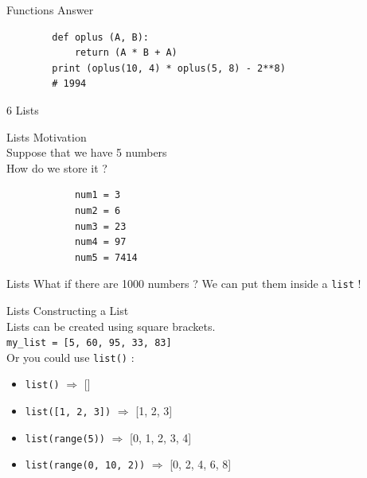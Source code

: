 \documentclass{beamer}
\begin{document}
    \begin{frame}[fragile]{Functions}
        \color{blue} \Large Answer \\
        \color{black} \normalsize \vskip 5pt
        \begin{verbatim}
        def oplus (A, B):
            return (A * B + A)
        print (oplus(10, 4) * oplus(5, 8) - 2**8)
        # 1994
        \end{verbatim}
    \end{frame} 
    
    \begin{frame}[plain, c]
    \begin{center}
        \color{blue} \LARGE 6 Lists
    \end{center}
    \end{frame}

    \begin{frame}[fragile]{Lists}
        \color{blue} \Large Motivation \\
        \color{black} \normalsize \vskip 5pt
        Suppose that we have 5 numbers \\
        How do we store it ? \\
        \begin{verbatim}
            num1 = 3
            num2 = 6
            num3 = 23
            num4 = 97
            num5 = 7414
        \end{verbatim}
    \end{frame}

    \begin{frame}{Lists}
        What if there are 1000 numbers ?
        \vskip 20pt 
        We can put them inside a \texttt{list} !
    \end{frame}
    
    \begin{frame}{Lists}
        \color{blue} \Large Constructing a List \\
        \color{black} \normalsize \vskip 5pt
        Lists can be created using square brackets.\\
        \texttt{my\_list = [5, 60, 95, 33, 83]} \\ 
        Or you could use \texttt{list()} : 
        \begin{itemize}
            \item \texttt{list()} $\Rightarrow$ []
            \item \texttt{list([1, 2, 3])} $\Rightarrow$ [1, 2, 3]
            \item \texttt{list(range(5))} $\Rightarrow$ [0, 1, 2, 3, 4]
            \item \texttt{list(range(0, 10, 2))} $\Rightarrow$ [0, 2, 4, 6, 8]
        \end{itemize}
    \end{frame}
\end{document}
